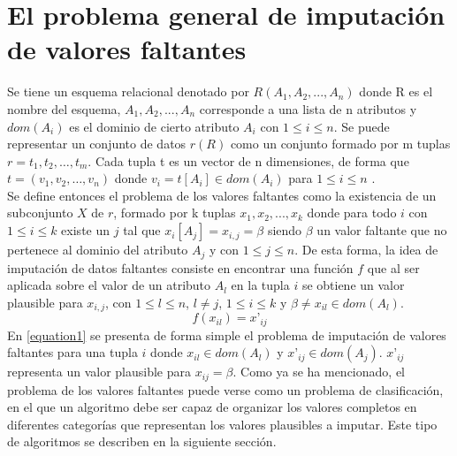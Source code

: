 \section{El problema general de imputación de valores faltantes} 
Se tiene un esquema relacional denotado por ${R(A_{1},A_{2},...,A_{n})}$ donde R es el nombre del esquema, ${A_{1},A_{2},...,A_{n}}$ corresponde a una lista de n atributos y ${dom(A_{i})}$ es el dominio de cierto atributo ${A_{i}}$ con ${1\leq i\leq n}$. Se puede representar un conjunto de datos ${r(R)}$ como un conjunto formado por m tuplas ${r=t_{1}, t_{2},…, t_{m}}$. Cada tupla t es un vector de n dimensiones, de forma que ${t=(v_{1}, v_{2},…, v_{n})}$ donde ${ v_{i} = t[A_{i}]\in dom(A_{i})}$ para ${1\leq i\leq n}$ \cite{dutta2011real}. \\
Se define entonces el problema de los valores faltantes como la existencia de un subconjunto ${X}$  de ${r}$, formado por k tuplas ${x_{1},x_{2},...,x_{k}}$ donde para todo ${i}$ con ${1\leq i\leq k}$ existe un ${j}$ tal que ${x_{i}[A_{j}] = x_{i,j} = \beta }$ siendo ${\beta }$ un valor faltante que no pertenece al dominio del atributo ${A_{j}}$ y con ${1\leq j\leq n}$. De esta forma, la idea de imputación de datos faltantes consiste en encontrar una función ${f}$ que al ser aplicada sobre el valor de un atributo ${A_{l}}$ en la tupla ${i}$ se obtiene un valor plausible para ${ x_{i,j}}$, con ${1\leq l\leq n}$, ${l \neq  j}$, ${1\leq i\leq k}$ y ${\beta \neq x_{il} \in dom(A_{l})}$.
\begin{equation}
\label{equation1}
f(x_{il}) = x’_{ij}
\end{equation}
En \ref{equation1} se presenta de forma simple el problema de imputación de valores faltantes para una tupla ${i}$ donde ${x_{il} \in dom(A_{l})}$ y ${x’_{ij} \in dom(A_{j})}$. ${x’_{ij}}$ representa un valor plausible para ${x_{ij} = \beta}$.
Como ya se ha mencionado, el problema de los valores faltantes puede verse como un problema de clasificación, en el que un algoritmo debe ser capaz de organizar los valores completos en diferentes categorías que representan los valores plausibles a imputar. Este tipo de algoritmos se describen en la siguiente sección.
